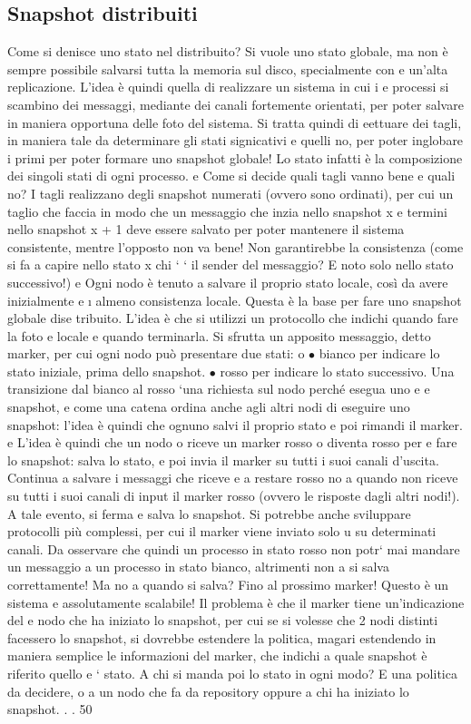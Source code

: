 \documentclass[a4paper,12pt]{article}
\begin{document}
\subsection{Snapshot distribuiti}
Come si denisce uno stato nel distribuito? Si vuole uno stato globale, ma
non è sempre possibile salvarsi tutta la memoria sul disco, specialmente con
e
un'alta replicazione. L'idea è quindi quella di realizzare un sistema in cui i
e
processi si scambino dei messaggi, mediante dei canali fortemente orientati, per
poter salvare in maniera opportuna delle foto del sistema. Si tratta quindi di
eettuare dei tagli, in maniera tale da determinare gli stati signicativi e quelli
no, per poter inglobare i primi per poter formare uno snapshot globale! Lo stato
infatti è la composizione dei singoli stati di ogni processo.
e
Come si decide quali tagli vanno bene e quali no? I tagli realizzano degli
snapshot numerati (ovvero sono ordinati), per cui un taglio che faccia in modo
che un messaggio che inzia nello snapshot x e termini nello snapshot x + 1 deve
essere salvato per poter mantenere il sistema consistente, mentre l'opposto non
va bene! Non garantirebbe la consistenza (come si fa a capire nello stato x chi
`
` il sender del messaggio? E noto solo nello stato successivo!)
e
Ogni nodo è tenuto a salvare il proprio stato locale, così da avere inizialmente
e
\i{}
almeno consistenza locale. Questa è la base per fare uno snapshot globale dise
tribuito. L'idea è che si utilizzi un protocollo che indichi quando fare la foto
e
locale e quando terminarla. Si sfrutta un apposito messaggio, detto marker, per
cui ogni nodo può presentare due stati:
o
$\bullet$ bianco per indicare lo stato iniziale, prima dello snapshot.
$\bullet$ rosso per indicare lo stato successivo.
Una transizione dal bianco al rosso `una richiesta sul nodo perché esegua uno
e
e
snapshot, e come una catena ordina anche agli altri nodi di eseguire uno snapshot: l'idea è quindi che ognuno salvi il
proprio stato e poi rimandi il marker.
e
L'idea è quindi che un nodo o riceve un marker rosso o diventa rosso per
e
fare lo snapshot: salva lo stato, e poi invia il marker su tutti i suoi canali
d'uscita. Continua a salvare i messaggi che riceve e a restare rosso no a quando
non riceve su tutti i suoi canali di input il marker rosso (ovvero le risposte
dagli altri nodi!). A tale evento, si ferma e salva lo snapshot. Si potrebbe
anche sviluppare protocolli più complessi, per cui il marker viene inviato solo
u
su determinati canali. Da osservare che quindi un processo in stato rosso non
potr` mai mandare un messaggio a un processo in stato bianco, altrimenti non
a
si salva correttamente!
Ma no a quando si salva? Fino al prossimo marker! Questo è un sistema
e
assolutamente scalabile! Il problema è che il marker tiene un'indicazione del
e
nodo che ha iniziato lo snapshot, per cui se si volesse che 2 nodi distinti facessero
lo snapshot, si dovrebbe estendere la politica, magari estendendo in maniera
semplice le informazioni del marker, che indichi a quale snapshot è riferito quello
e
`
stato. A chi si manda poi lo stato in ogni modo? E una politica da decidere, o
a un nodo che fa da repository oppure a chi ha iniziato lo snapshot. . .
50
\end{document}
